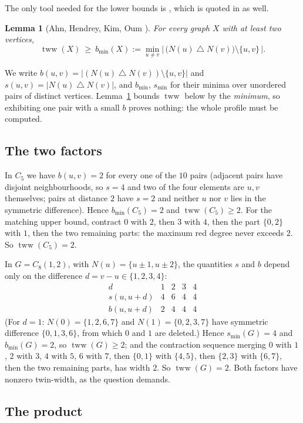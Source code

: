 \documentclass[11pt]{amsart}
\newtheorem{lemma}[theorem]{Lemma}
\theoremstyle{remark}
\DeclareMathOperator{\tww}{tww}
\newcommand{\sd}{\mathbin{\triangle}}
\begin{document}
The only tool needed for the lower bounds is \cite[Lemma~3.1]{AHKO}, which is
quoted in \cite{PS} as well.

\begin{lemma}[Ahn, Hendrey, Kim, Oum \cite{AHKO}]\label{lem:lb}
For every graph $X$ with at least two vertices,
\[
 \tww(X)\ \ge\ b_{\min}(X)
 :=\min_{u\ne v}\bigl|\,\bigl(N(u)\sd N(v)\bigr)\setminus\{u,v\}\,\bigr| .
\]
\end{lemma}

We write $b(u,v)=|(N(u)\sd N(v))\setminus\{u,v\}|$ and
$s(u,v)=|N(u)\sd N(v)|$, and $b_{\min}$, $s_{\min}$ for their minima over
unordered pairs of distinct vertices. Lemma~\ref{lem:lb} bounds $\tww$ below by
the \emph{minimum}, so exhibiting one pair with a small $b$ proves nothing: the
whole profile must be computed.

\subsection*{The two factors}

In $C_5$ we have $b(u,v)=2$ for every one of the $10$ pairs (adjacent pairs
have disjoint neighbourhoods, so $s=4$ and two of the four elements are $u,v$
themselves; pairs at distance $2$ have $s=2$ and neither $u$ nor $v$ lies in
the symmetric difference). Hence $b_{\min}(C_5)=2$ and $\tww(C_5)\ge2$. For the
matching upper bound, contract $0$ with $2$, then $3$ with $4$, then the part
$\{0,2\}$ with $1$, then the two remaining parts: the maximum red degree never
exceeds $2$. So $\tww(C_5)=2$.

In $G=C_8(1,2)$, with $N(u)=\{u\pm1,u\pm2\}$, the quantities $s$ and $b$ depend
only on the difference $d=v-u\in\{1,2,3,4\}$:
\[
\begin{array}{c|cccc}
 d & 1 & 2 & 3 & 4\\\hline
 s(u,u+d) & 4 & 6 & 4 & 4\\
 b(u,u+d) & 2 & 4 & 4 & 4
\end{array}
\]
(For $d=1$: $N(0)=\{1,2,6,7\}$ and $N(1)=\{0,2,3,7\}$ have symmetric
difference $\{0,1,3,6\}$, from which $0$ and $1$ are deleted.) Hence
$s_{\min}(G)=4$ and $b_{\min}(G)=2$, so $\tww(G)\ge2$; and the contraction
sequence merging $0$ with $1$, $2$ with $3$, $4$ with $5$, $6$ with $7$, then
$\{0,1\}$ with $\{4,5\}$, then $\{2,3\}$ with $\{6,7\}$, then the two remaining
parts, has width $2$. So $\tww(G)=2$. Both factors have nonzero twin-width, as
the question demands.

\subsection*{The product}
\end{document}
